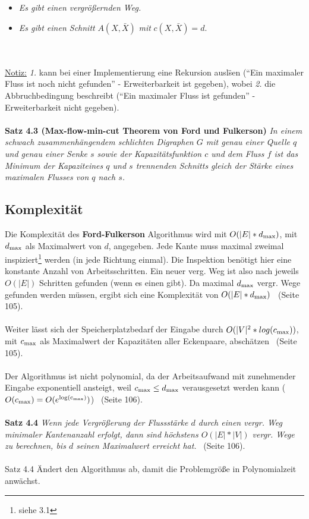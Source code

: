 \documentclass[11pt]{article}
\begin{document}
\begin{itemize}
\item[1.] \textit{Es gibt einen vergr\"o\ss{}ernden Weg.}
\item[2.] \textit{Es gibt einen Schnitt} $A(X,\bar X)$ \textit{mit} $c(X,\bar X) = d$.
\end{itemize}\\~\\
\underline{Notiz:} \textit{1.} kann bei einer Implementierung eine Rekursion ausl\"sen ("`Ein maximaler Fluss ist noch nicht gefunden"' - Erweiterbarkeit ist gegeben), wobei \textit{2.} die Abbruchbedingung beschreibt ("`Ein maximaler Fluss ist gefunden"' - Erweiterbarkeit nicht gegeben).\\~\\
\textbf{Satz 4.3 (Max-flow-min-cut Theorem von Ford und Fulkerson)} \textit{In einem schwach zusammenh\"angendem schlichten Digraphen $G$ mit genau
einer Quelle $q$ und genau einer Senke $s$ sowie der Kapazit\"atsfunktion $c$ und
dem Fluss $f$ ist das Minimum der Kapazit\at eines $q$ und $s$ trennenden Schnitts
gleich der St\"arke eines maximalen Flusses von $q$ nach $s$.}

\subsection{Komplexit\"at}
Die Komplexit\"at des \textbf{Ford-Fulkerson} Algorithmus wird mit $O(|E| * d\textsubscript{max})$, mit $d\textsubscript{max}$ als Maximalwert von $d$, angegeben. Jede Kante muss maximal zweimal inspiziert\footnote{siehe 3.1} werden (in jede Richtung einmal). Die Inspektion ben\"otigt hier eine konstante Anzahl von Arbeitsschritten. Ein neuer verg. Weg ist also nach jeweils $O(|E|)$ Schritten gefunden (wenn es einen gibt). Da maximal $d\textsubscript{max}$ vergr. Wege gefunden werden m\"ussen, ergibt sich eine Komplexit\"at von $O(|E| * d\textsubscript{max})$~\cite{grbuch} (Seite 105).\\~\\
Weiter l\"asst sich der Speicherplatzbedarf der Eingabe durch $O(|V|\textsuperscript{2} * log(c\textsubscript{max}))$, mit $c\textsubscript{max}$ als Maximalwert der Kapazit\"aten aller Eckenpaare, absch\"atzen~\cite{grbuch} (Seite 105).\\~\\
Der Algorithmus ist nicht polynomial, da der Arbeitsaufwand mit zunehmender Eingabe exponentiell ansteigt, weil $c\textsubscript{max} \leq d\textsubscript{max}$ verausgesetzt werden kann ($O(c\textsubscript{max}) = O(e\textsuperscript{log(c\textsubscript{max})})$)~\cite{grbuch} (Seite 106).\\~\\
\textbf{Satz 4.4} \textit{Wenn jede Vergr\"o\ss{}erung der Flussst\"arke $d$ durch einen vergr. Weg minimaler Kantenanzahl erfolgt, dann sind h\"ochstens $O(|E| * |V|)$ vergr. Wege zu berechnen, bis $d$ seinen Maximalwert erreicht hat.}~\cite{grbuch} (Seite 106).\\~\\
Satz 4.4 \"Andert den Algorithmus ab, damit die Problemgr\"o\ss{}e in Polynomialzeit anw\"achst.
\end{document}
